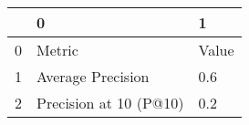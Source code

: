 \begin{tabular}{lll}
\toprule
{} &                       0 &      1 \\
\midrule
0 &                  Metric &  Value \\
1 &       Average Precision &    0.6 \\
2 &  Precision at 10 (P@10) &    0.2 \\
\bottomrule
\end{tabular}
